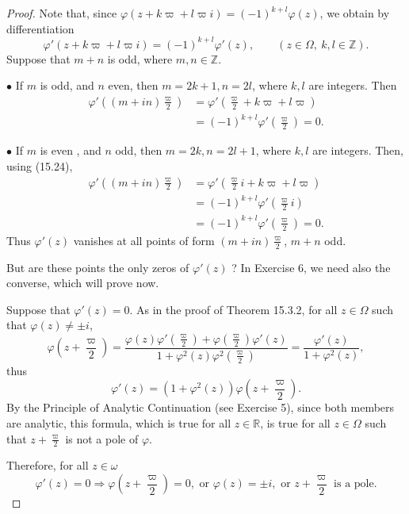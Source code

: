 \documentclass[11pt,a4paper]{article}
\newcommand{\Z}{\mathbb{Z}}
\newcommand{\R}{\mathbb{R}}
\begin{document}
\begin{proof} 
Note that, since $\varphi(z + k \varpi + l \varpi i) = (-1)^{k+l}\varphi(z)$, we obtain by differentiation
$$\varphi'(z + k \varpi + l \varpi i) = (-1)^{k+l}\varphi'(z), \qquad (z \in \Omega, \ k,l \in \Z).$$
Suppose that $m+n$ is odd, where $m,n \in \Z$. 
\item[$\bullet$] If $m$ is odd, and $n$ even, then $m = 2k+1, n = 2l$, where $k,l$ are integers. Then
\begin{align*}
\varphi'\left(( m +in)\frac{\varpi}{2}\right) &=  \varphi'\left( \frac{\varpi}{2} + k \varpi + l \varpi \right)\\
&= (-1)^{k+l} \varphi'\left( \frac{\varpi}{2}\right) = 0.
\end{align*}
\item[$\bullet$] If $m$ is even , and $n$ odd, then $m = 2k, n = 2l + 1$, where $k,l$ are integers. Then, using (15.24),
\begin{align*}
\varphi'\left(( m +in)\frac{\varpi}{2}\right) &=  \varphi'\left( \frac{\varpi}{2}i + k \varpi + l \varpi \right)\\
&= (-1)^{k+l} \varphi'\left( \frac{\varpi}{2}i\right) \\
&= (-1)^{k+l} \varphi'\left( \frac{\varpi}{2}\right) = 0.
\end{align*}
Thus  $\varphi'(z)$ vanishes at all points of form $(m+in)\frac{\varpi}{2}$, $m+n$ odd.

\bigskip

But are these points the only zeros of $\varphi'(z)$ ? In Exercise 6, we need also the converse, which will prove now.

Suppose that $\varphi'(z) = 0$. As in the proof of Theorem 15.3.2, for all $z \in \Omega$ such that $\varphi(z) \ne \pm i$,
$$\varphi \left(z + \frac{\varpi}{2} \right) = \frac{\varphi(z) \varphi'\left(\frac{\varpi}{2}\right) + \varphi\left(\frac{\varpi}{2}\right) \varphi'(z)}{1 + \varphi^2(z) \varphi^2\left(\frac{\varpi}{2}\right)}=\frac{\varphi'(z)}{1 + \varphi^2(z)},$$
thus
$$\varphi'(z) = (1 + \varphi^2(z)) \varphi \left(z + \frac{\varpi}{2} \right).$$
By the Principle of Analytic Continuation (see Exercise 5), since both members are analytic, this formula, which is true for all $z \in \R$, is true for all $z \in \Omega$ such that $z+ \frac{\varpi}{2}$ is not a pole of $\varphi$.

Therefore, for all $z\in \omega$
$$\varphi'(z) = 0 \Rightarrow \varphi \left(z + \frac{\varpi}{2} \right) = 0, \text { or } \varphi(z) = \pm i,  \text { or } z + \frac{\varpi}{2} \text{ is a pole}.$$


\end{proof}
\end{document}
